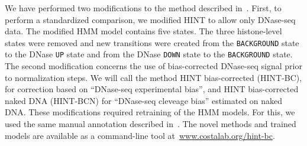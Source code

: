 We have performed two modifications to the method described in~\cite{gusmao2014}. First, to perform a standardized comparison, we modified HINT to allow only DNase-seq data. The modified HMM model contains five states. The three histone-level states were removed and new transitions were created from the {\tt BACKGROUND} state to the DNase {\tt UP} state and from the DNase {\tt DOWN} state to the {\tt BACKGROUND} state. The second modification concerns the use of bias-corrected DNase-seq signal prior to normalization steps. We will call the method HINT bias-corrected (HINT-BC), for correction based on ``DNase-seq experimental bias'', and HINT bias-corrected naked DNA (HINT-BCN) for ``DNase-seq cleveage bias'' estimated on naked DNA. These modifications required retraining of the HMM models. For this, we used the same manual annotation described in~\cite{gusmao2014}. The novel methods and trained models are available as a command-line tool at~\url{www.costalab.org/hint-bc}.








